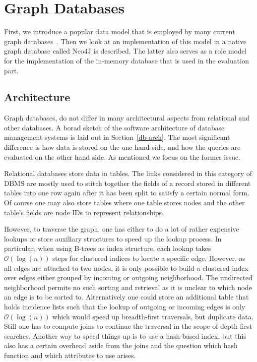 \chapter{Graph Databases}
    First, we introduce a popular data model that is employed by many current graph databases~\autocite{GitHubneo4j, ArangoDB, AmazonNeptune, RedisGraph}.
    Then we look at an implementation of this model in a native graph database called Neo4J is described. 
    The latter also serves as a role model for the implementation of the in-memory database that is used in the evaluation part.
                
    \section{Architecture}
        Graph databases, do not differ in many architectural aspects from relational and other databases. A borad sketch of the software architecture of database management systems is laid out in Section~\ref{db-arch}. 
        The most significant difference is how data is stored on the one hand side, and how the queries are evaluated on the other hand side.
        As mentioned we focus on the former issue.
        
        Relational databases store data in tables.
        The links considered in this category of DBMS are mostly used to stitch together the fields of a record stored in different tables into one row again after it has been split to satisfy a certain normal form.
        Of course one may also store tables where one table stores nodes and the other table's fields are node IDs to represent relationships.

        However, to traverse the graph, one has either to do a lot of rather expensive lookups or store auxiliary structures to speed up the lookup process.
        In particular, when using B-trees as index structure, each lookup takes $\mathcal{O}(\log(n))$ steps for clustered indices to locate a specific edge. However, as all edges are attached to two nodes, it is only possible to build a clustered index over edges either grouped by incoming or outgoing neighborhood. The undirected neighborhood permits no such sorting and retrieval as it is unclear to which node an edge is to be sorted to.
        Alternatively one could store an additional table that holds incidence lists such that the lookup of outgoing or incoming edges is only $\mathcal{O}(\log(n))$ which would speed up breadth-first traversals, but duplicate data.
        Still one has to compute joins to continue the traversal in the scope of depth first searches.
        Another way to speed things up is to use a hash-based index, but this also has a certain overhead aside from the joins and the question which hash function and which attributes to use arises.
        
